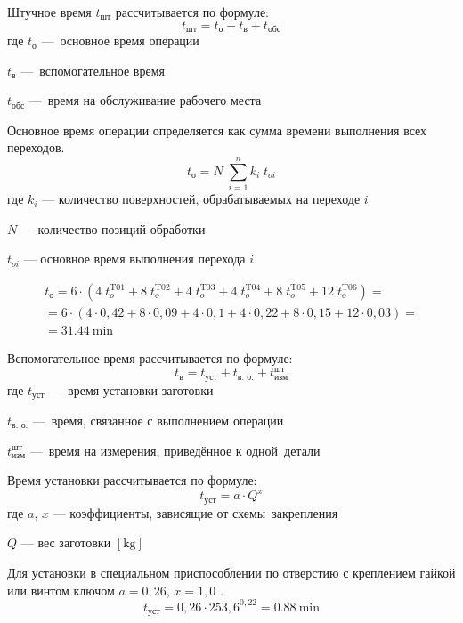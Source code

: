 \documentclass[14pt,russian,a4paper]{extreport}
\begin{document}
Штучное время $t_\text{шт}$ рассчитывается по формуле:
\begin{equation}
  t_\text{шт} = t_\text{о} + t_\text{в} + t_\text{обс}
\end{equation}
где $t_\text{о}$ --- основное время операции \par
$t_\text{в}$ --- вспомогательное время \par
$t_\text{обс}$ --- время на обслуживание рабочего места

Основное время операции определяется как сумма времени выполнения всех переходов.
\begin{equation}
  t_\text{о} = N \; \sum_{i=1}^n k_i \; t_{oi}
\end{equation}
где $k_i$ --- количество поверхностей, обрабатываемых на переходе $i$ \par
$N$ --- количество позиций обработки \par
$t_{oi}$ --- основное время выполнения перехода $i$

\begin{multline*}
  t_\text{о} = 6 \cdot ( 4 \; t_{o}^\text{T01} + 8 \; t_{o}^\text{T02} + 4 \; 
  t_{o}^\text{T03} + 4 \; t_{o}^\text{T04} + 8 \; t_{o}^\text{T05} + 12 \; t_{o}^\text{T06} ) = \\ = 6 \cdot ( 4 \cdot 0,42 + 8 \cdot 0,09 + 4 \cdot 0,1 + 4 \cdot 0,22 + 8 \cdot 0,15 + 12 \cdot 0,03 ) = \\ = \SI{31,44}{\minute}
\end{multline*}

Вспомогательное время рассчитывается по формуле:
\begin{equation}
  t_\text{в} = t_\text{уст} + t_\text{в. о.} + t_\text{изм}^\text{шт}
\end{equation}
где $t_\text{уст}$ --- время установки заготовки \par
$t_\text{в. о.}$ --- время, связанное с выполнением операции \par
$t_\text{изм}^\text{шт}$ --- время на измерения, приведённое к одной детали

Время установки рассчитывается по формуле:
\begin{equation}
  t_\text{уст} = a \cdot Q^x
\end{equation}
где $a$, $x$ --- коэффициенты, зависящие от схемы закрепления \par
$Q$ --- вес заготовки $\left[\si{\kilo\gram}\right]$

Для установки в специальном приспособлении по отверстию с креплением гайкой или винтом ключом $ a = 0,26 $, $ x = 1,0 $ \cite[прил.~3]{malzen:normirovanie}.
\begin{equation*}
  t_\text{уст} = 0,26 \cdot 253,6^{0,22} = \SI{0,88}{\minute}
\end{equation*}
\end{document}
